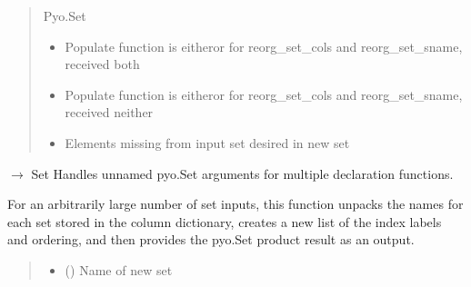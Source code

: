 \documentclass[letterpaper,10pt,english]{sphinxmanual}
\begin{document}
\begin{fulllineitems}
\begin{fulllineitems}
\begin{quote}
\begin{description}
\sphinxAtStartPar
Pyo.Set

\begin{itemize}
\item {} 
\sphinxAtStartPar
{} \textendash{} Populate function is either\sphinxhyphen{}or for reorg\_set\_cols and reorg\_set\_sname, received both

\item {} 
\sphinxAtStartPar
{} \textendash{} Populate function is either\sphinxhyphen{}or for reorg\_set\_cols and reorg\_set\_sname, received neither

\item {} 
\sphinxAtStartPar
{} \textendash{} Elements missing from input set desired in new set

\end{itemize}

\end{description}\end{quote}

\end{fulllineitems}


\begin{fulllineitems}
\label{\detokenize{src.common.model:src.common.model.Model.unpack_set_arguments}}
\pysigstartsignatures
\pysiglinewithargsret
{}
{\sphinxparamcomma {}\sphinxparamcomma {}}
{{ $\rightarrow$ Set}}
\pysigstopsignatures
\sphinxAtStartPar
Handles unnamed pyo.Set arguments for multiple declaration functions.

\sphinxAtStartPar
For an arbitrarily large number of set inputs, this function unpacks the names for each set
stored in the column dictionary, creates a new list of the index labels and ordering, and
then provides the pyo.Set product result as an output.
\begin{quote}\begin{description}
\begin{itemize}
\item {} 
\sphinxAtStartPar
{} () \textendash{} Name of new set


\end{itemize}
\end{description}
\end{quote}
\end{fulllineitems}
\end{fulllineitems}
\end{document}
